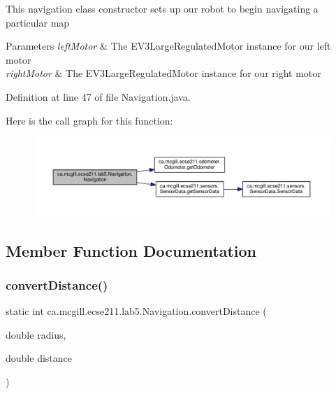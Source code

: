 This navigation class constructor sets up our robot to begin navigating a particular map


\begin{DoxyParams}{Parameters}
{\em left\+Motor} & The E\+V3\+Large\+Regulated\+Motor instance for our left motor \\
\hline
{\em right\+Motor} & The E\+V3\+Large\+Regulated\+Motor instance for our right motor \\
\hline
\end{DoxyParams}


Definition at line 47 of file Navigation.\+java.

Here is the call graph for this function\+:\nopagebreak
\begin{figure}[H]
\begin{center}
\leavevmode
\includegraphics[width=350pt]{classca_1_1mcgill_1_1ecse211_1_1lab5_1_1_navigation_a93b746f61226c3b14532c43d0c2f61dd_cgraph}
\end{center}
\end{figure}


\subsection{Member Function Documentation}
\mbox{\label{classca_1_1mcgill_1_1ecse211_1_1lab5_1_1_navigation_a85122ad723d0988c118866f367073be6}} 
\subsubsection{\texorpdfstring{convert\+Distance()}{convertDistance()}}
{\footnotesize\ttfamily static int ca.\+mcgill.\+ecse211.\+lab5.\+Navigation.\+convert\+Distance (\begin{DoxyParamCaption}\item[{double}]{radius,  }\item[{double}]{distance }\end{DoxyParamCaption})\hspace{0.3cm}{\ttfamily [static]}}

